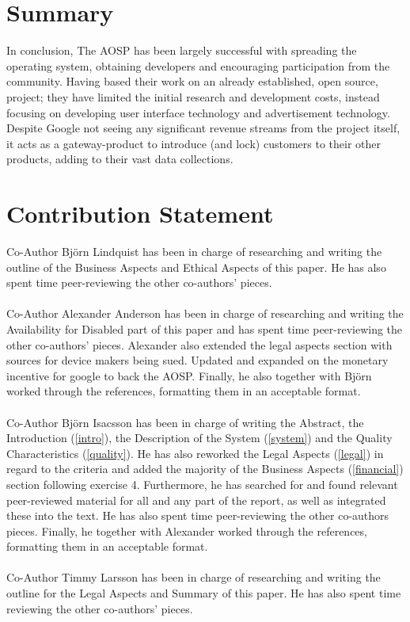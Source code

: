 \documentclass[conference]{IEEEtran}
\begin{document}
\section{Summary}
\label{summary}

In conclusion, The AOSP has been largely successful with spreading the operating system, obtaining developers and encouraging participation from the community. Having based their work on an already established, open source, project; they have limited the initial research and development costs, instead focusing on developing user interface technology and advertisement technology. Despite Google not seeing any significant revenue streams from the project itself, it acts as a gateway-product to introduce (and lock) customers to their other products, adding to their vast data collections.


\section{Contribution Statement}
\label{contribution}

Co-Author Björn Lindquist has been in charge of researching and writing the outline of the Business Aspects and Ethical Aspects of this paper. He has also spent time peer-reviewing the other co-authors' pieces.
\\\\Co-Author Alexander Anderson has been in charge of researching and writing the Availability for Disabled part of this paper and has spent time peer-reviewing the other co-authors' pieces. Alexander also extended the legal aspects section with sources for device makers being sued. Updated and expanded on the monetary incentive for google to back the AOSP. Finally, he also together with Björn worked through the references, formatting them in an acceptable format. 
\\\\Co-Author Björn Isacsson has been in charge of writing the Abstract, the Introduction (\ref{intro}), the Description of the System (\ref{system}) and the Quality Characteristics (\ref{quality}). He has also reworked the Legal Aspects (\ref{legal}) in regard to the criteria and added the majority of the Business Aspects (\ref{financial}) section following exercise 4. Furthermore, he has searched for and found relevant peer-reviewed material for all and any part of the report, as well as integrated these into the text. He has also spent time peer-reviewing the other co-authors pieces. Finally, he together with Alexander worked through the references, formatting them in an acceptable format.
\\\\Co-Author Timmy Larsson has been in charge of researching and writing the outline for the Legal Aspects and Summary of this paper. He has also spent time reviewing the other co-authors' pieces.
\end{document}

